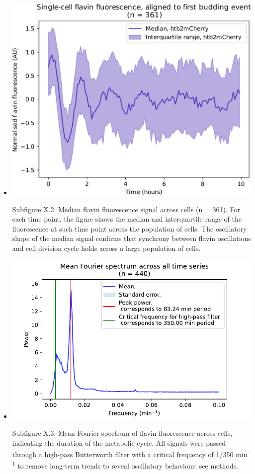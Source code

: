 \begin{itemize}
\begin{itemize}
\item \begin{center}
\includegraphics[width=.9\linewidth]{median_aligned_edit.pdf}
\end{center} Subfigure X.2: Median flavin fluorescence signal across cells (n = 361).  For each time point, the figure shows the median and interquartile range of the fluorescence at such time point across the population of cells.  The oscillatory shape of the median signal confirms that synchrony between flavin oscillations and cell division cycle holds across a large population of cells.
\item \begin{center}
\includegraphics[width=.9\linewidth]{fy4_26643_plots_10.png}
\end{center} Subfigure X.3: Mean Fourier spectrum of flavin fluorescence across cells, indicating the duration of the metabolic cycle.  All signals were passed through a high-pass Butterworth filter with a critical frequency of 1/350 min\textsuperscript{-1} to remove long-term trends to reveal oscillatory behaviour; see methods.

\end{itemize}
\end{itemize}
